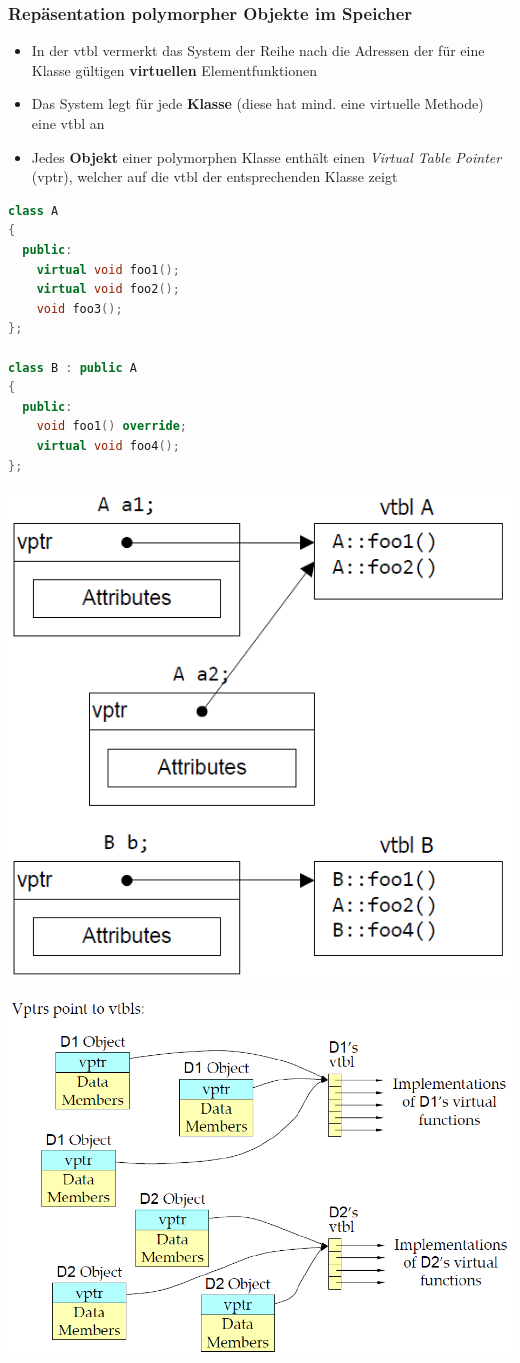 \subsubsection{Repäsentation polymorpher Objekte im Speicher}
\begin{itemize}
  \item In der vtbl vermerkt das System der Reihe nach die Adressen der für eine Klasse gültigen \textbf{virtuellen} Elementfunktionen
  \item Das System legt für jede \textbf{Klasse} (diese hat mind. eine virtuelle Methode) eine vtbl an
  \item Jedes \textbf{Objekt} einer polymorphen Klasse enthält einen \textit{Virtual Table Pointer} (vptr), welcher auf die vtbl der entsprechenden Klasse zeigt
\end{itemize}
\begin{multicols}{2}
\begin{lstlisting}[language=C++]
class A
{
  public:
    virtual void foo1();
    virtual void foo2();
    void foo3();
};

class B : public A
{
  public:
    void foo1() override;
    virtual void foo4();
};
\end{lstlisting}
\vfill\null
\columnbreak
\includegraphics[width=0.6\linewidth]{images/AdvancedCPP/vtblBsp}
\end{multicols}
\begin{center}
  \includegraphics[width=0.5\linewidth]{images/AdvancedCPP/vtbl4}
\end{center}

